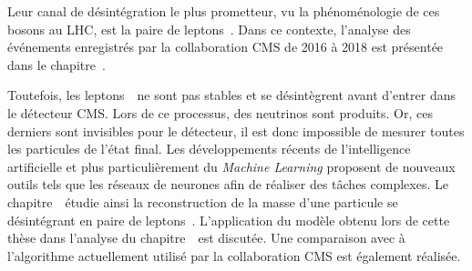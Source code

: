 Leur canal de désintégration le plus prometteur,
vu la phénoménologie de ces bosons au LHC,
est la paire de leptons~\tau.
Dans ce contexte,
l'analyse des événements enregistrés par la collaboration CMS de 2016 à 2018
est présentée dans le chapitre~.
\par
Toutefois,
les leptons~\tau\ ne sont pas stables
et se désintègrent avant d'entrer dans le détecteur CMS.
Lors de ce processus,
des neutrinos sont produits.
Or, ces derniers sont invisibles pour le détecteur,
il est donc impossible de mesurer toutes les particules de l'état final.
Les développements récents de l'intelligence artificielle
et plus particulièrement du \emph{Machine Learning}
proposent de nouveaux outils tels que les réseaux de neurones
afin de réaliser des tâches complexes.
Le chapitre~\ étudie ainsi
la reconstruction de la masse d'une particule se désintégrant en paire de leptons~\tau.
L'application du modèle obtenu lors de cette thèse
dans l'analyse du chapitre~\ est discutée.
Une comparaison avec
à l'algorithme actuellement utilisé par la collaboration CMS
est également réalisée.